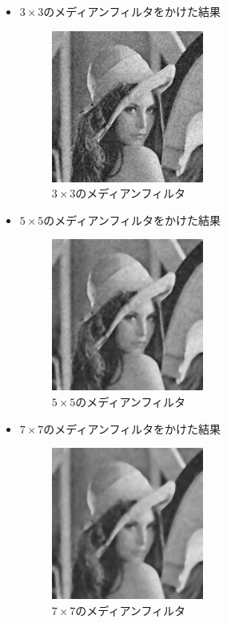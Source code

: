 \documentclass[a4paper,10pt,uplatex,dvipdfmx]{jsarticle}
\begin{document}
\begin{itemize}
  \item $3\times3$のメディアンフィルタをかけた結果
    \begin{figure}[H]
      \centering
      \includegraphics[width=5cm]{../src/img/output_median3x3.png}
      \caption{$3\times3$のメディアンフィルタ}
    \end{figure} 
  \item $5\times5$のメディアンフィルタをかけた結果
    \begin{figure}[H]
      \centering
      \includegraphics[width=5cm]{../src/img/output_median5x5.png}
      \caption{$5\times5$のメディアンフィルタ}
    \end{figure} 
  \item $7\times7$のメディアンフィルタをかけた結果
    \begin{figure}[H]
      \centering
      \includegraphics[width=5cm]{../src/img/output_median7x7.png}
      \caption{$7\times7$のメディアンフィルタ}
    \end{figure} 
\end{itemize}
\end{document}
